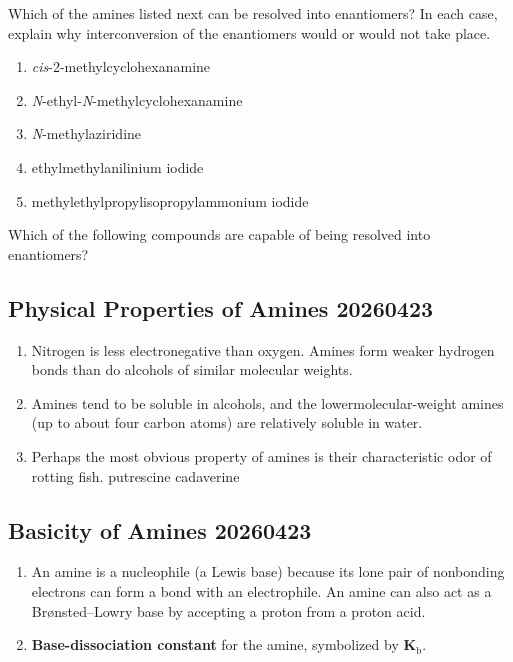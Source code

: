 \begin{example} %
    Which of the amines listed next can be resolved into enantiomers? In each case, explain why interconversion of the enantiomers would or would not take place. 
    \begin{enumerate}[label=(\alph*)]
        \item \textit{cis}-2-methylcyclohexanamine
        \item \textit{N}-ethyl-\textit{N}-methylcyclohexanamine
        \item \textit{N}-methylaziridine
        \item ethylmethylanilinium iodide
        \item methylethylpropylisopropylammonium iodide
    \end{enumerate}
\end{example}

\begin{example} %
    Which of the following compounds are capable of being resolved into enantiomers?
\end{example}

\subsection{Physical Properties of Amines 20260423}

\begin{enumerate}
    \item Nitrogen is less electronegative than oxygen. Amines form weaker hydrogen bonds than do alcohols of similar molecular weights.
    \item Amines tend to be soluble in alcohols, and the lowermolecular-weight amines (up to about four carbon atoms) are relatively soluble in water.
    \item Perhaps the most obvious property of amines is their characteristic odor of rotting fish.
    putrescine %
    cadaverine %
\end{enumerate}

\subsection{Basicity of Amines 20260423}

\begin{enumerate}
    \item An amine is a nucleophile (a Lewis base) because its lone pair of nonbonding electrons can form a bond with an electrophile. An amine can also act as a Brønsted–Lowry base by accepting a proton from a proton acid.
    \item \textbf{Base-dissociation constant} for the amine, symbolized by $\textbf{K}_{\mathrm{b}}$.
\end{enumerate}

